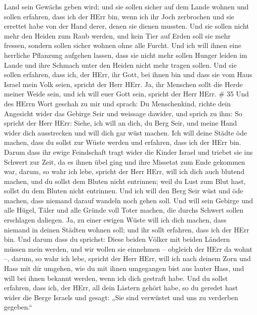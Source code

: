 Land sein Gewächs geben wird; und sie sollen sicher auf dem Lande wohnen
und sollen erfahren, dass ich der HErr bin, wenn ich ihr Joch zerbrochen
und sie errettet habe von der Hand derer, denen sie dienen mussten.
 Und sie sollen nicht mehr den Heiden zum Raub werden, und
kein Tier auf Erden soll sie mehr fressen, sondern sollen sicher wohnen
ohne alle Furcht.  Und ich will ihnen eine herrliche
Pflanzung aufgehen lassen, dass sie nicht mehr sollen Hunger leiden im
Lande und ihre Schmach unter den Heiden nicht mehr tragen sollen.
 Und sie sollen erfahren, dass ich, der HErr, ihr Gott, bei
ihnen bin und dass sie vom Haus Israel mein Volk seien, spricht der Herr
HErr.  Ja, ihr Menschen sollt die Herde meiner Weide sein,
und ich will euer Gott sein, spricht der Herr HErr. \# 35 
Und des HErrn Wort geschah zu mir und sprach:  Du
Menschenkind, richte dein Angesicht wider das Gebirge Seir und weissage
dawider,  und sprich zu ihm: So spricht der Herr HErr:
Siehe, ich will an dich, du Berg Seir, und meine Hand wider dich
ausstrecken und will dich gar wüst machen.  Ich will deine
Städte öde machen, dass du sollst zur Wüste werden und erfahren, dass
ich der HErr bin.  Darum dass ihr ewige Feindschaft tragt
wider die Kinder Israel und triebet sie ins Schwert zur Zeit, da es
ihnen übel ging und ihre Missetat zum Ende gekommen war, 
darum, so wahr ich lebe, spricht der Herr HErr, will ich dich auch
blutend machen, und du sollst dem Bluten nicht entrinnen; weil du Lust
zum Blut hast, sollst du dem Bluten nicht entrinnen.  Und
ich will den Berg Seir wüst und öde machen, dass niemand darauf wandeln
noch gehen soll.  Und will sein Gebirge und alle Hügel,
Täler und alle Gründe voll Toter machen, die durchs Schwert sollen
erschlagen daliegen.  Ja, zu einer ewigen Wüste will ich
dich machen, dass niemand in deinen Städten wohnen soll; und ihr sollt
erfahren, dass ich der HErr bin.  Und darum dass du
sprichst: Diese beiden Völker mit beiden Ländern müssen mein werden, und
wir wollen sie einnehmen -- obgleich der HErr da wohnt --, 
darum, so wahr ich lebe, spricht der Herr HErr, will ich nach deinem
Zorn und Hass mit dir umgehen, wie du mit ihnen umgegangen bist aus
lauter Hass, und will bei ihnen bekannt werden, wenn ich dich gestraft
habe.  Und du sollst erfahren, dass ich, der HErr, all dein
Lästern gehört habe, so du geredet hast wider die Berge Israels und
gesagt: „Sie sind verwüstet und uns zu verderben gegeben.``
